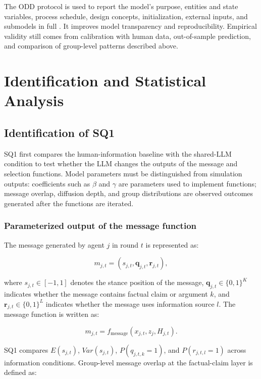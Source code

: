\documentclass[11pt,a4paper]{article}
\begin{document}
The ODD protocol is used to report the model's purpose, entities and state variables, process schedule, design concepts, initialization, external inputs, and submodels in full \cite{grimm2020}. It improves model transparency and reproducibility. Empirical validity still comes from calibration with human data, out-of-sample prediction, and comparison of group-level patterns described above.

\section{Identification and Statistical Analysis}

\subsection{Identification of SQ1}

SQ1 first compares the human-information baseline with the shared-LLM condition to test whether the LLM changes the outputs of the message and selection functions. Model parameters must be distinguished from simulation outputs: coefficients such as $\beta$ and $\gamma$ are parameters used to implement functions; message overlap, diffusion depth, and group distributions are observed outcomes generated after the functions are iterated.

\subsubsection{Parameterized output of the message function}

The message generated by agent $j$ in round $t$ is represented as:

\begin{equation*}
m_{j,t}
=
\left(
s_{j,t},
\mathbf q_{j,t},
\mathbf r_{j,t}
\right),
\end{equation*}

where $s_{j,t}\in[-1,1]$ denotes the stance position of the message, $\mathbf q_{j,t}\in\{0,1\}^{K}$ indicates whether the message contains factual claim or argument $k$, and $\mathbf r_{j,t}\in\{0,1\}^{L}$ indicates whether the message uses information source $l$. The message function is written as:

\begin{equation*}
m_{j,t}
=
f_{\text{message}}
(x_{j,t},z_j,H_{j,t}).
\end{equation*}

SQ1 compares $E(s_{j,t})$, $Var(s_{j,t})$, $P(q_{j,t,k}=1)$, and $P(r_{j,t,l}=1)$ across information conditions. Group-level message overlap at the factual-claim layer is defined as:
\end{document}
